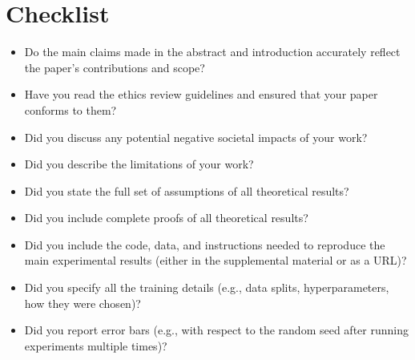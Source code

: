\section*{Checklist}

\begin{itemize}
    \item 
    Do the main claims made in the abstract and introduction accurately reflect the paper's contributions and scope?
    
    
    \item
    Have you read the ethics review guidelines and ensured that your paper conforms to them?
    
    \answerYes{}
    
    \item
    Did you discuss any potential negative societal impacts of your work?
    
    \answerTODO{}
    
    \item
    Did you describe the limitations of your work?
    
    
    \item
    Did you state the full set of assumptions of all theoretical results?
    
    
    \item
    Did you include complete proofs of all theoretical results?
    
    
    \item
    Did you include the code, data, and instructions needed to reproduce the main experimental results (either in the supplemental material or as a URL)?
    
    
    \item
    Did you specify all the training details (e.g., data splits, hyperparameters, how they were chosen)?
    
    
    \item
    Did you report error bars (e.g., with respect to the random seed after running experiments multiple times)?
    

\end{itemize}
